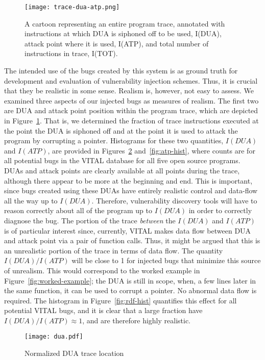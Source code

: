 \begin{figure}
\centering
\texttt{[image: trace-dua-atp.png]}
\caption{A cartoon representing an entire program trace, annotated with instructions at which DUA is siphoned off to be used, I(DUA), attack point where it is used, I(ATP), and total number of instructions in trace, I(TOT).}
\label{fig:dua-atp-trace}
\end{figure}

The intended use of the bugs created by this system is as ground truth for development and evaluation of vulnerability injection schemes.
Thus, it is crucial that they be realistic in some sense.  
Realism is, however, not easy to assess.
We examined three aspects of our injected bugs as measures of realism. 
The first two are DUA and attack point position within the program trace, which are depicted in Figure~\ref{fig:dua-atp-trace}.
That is, we determined the fraction of trace instructions executed at the point the DUA is siphoned off and at the point it is used to attack the program by corrupting a pointer.
Histograms for these two quantities, $I(DUA)$ and $I(ATP)$, are provided in Figures~\ref{fig:dua-hist} and~\ref{fig:atp-hist}, where counts are for all potential bugs in the VITAL database for all five open source programs. 
DUAs and attack points are clearly available at all points during the trace, although there appear to be more at the beginning and end.
This is important, since bugs created using these DUAs have entirely realistic control and data-flow all the way up to $I(DUA)$.
Therefore, vulnerability discovery tools will have to reason correctly about all of the program up to $I(DUA)$ in order to correctly diagnose the bug.
The portion of the trace \emph{between} the $I(DUA)$ and $I(ATP)$ is of particular interest since, currently, VITAL makes data flow between DUA and attack point via a pair of function calls.
Thus, it might be argued that this is an unrealistic portion of the trace in terms of data flow.
The quantity $I(DUA)/I(ATP)$ will be close to 1 for injected bugs that minimize this source of unrealism.
This would correspond to the worked example in Figure~\ref{fig:worked-example}; the DUA is still in scope, when, a few lines later in the same function, it can be used to corrupt a pointer.
No abnormal data flow is required.
The histogram in Figure~\ref{fig:rdf-hist} quantifies this effect for all potential VITAL bugs, and it is clear that a large fraction have $I(DUA)/I(ATP) \approx 1$, and are therefore highly realistic.

\begin{figure}
\centering
\texttt{[image: dua.pdf]}
\caption{Normalized DUA trace location}
\label{fig:dua-hist}
\end{figure}

